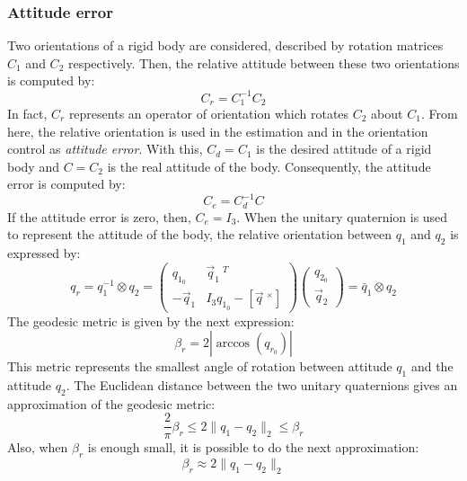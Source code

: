  \subsubsection{Attitude error}

 Two orientations of a rigid body are considered, described by rotation matrices $C_1$ and $C_2$ respectively. Then, the relative attitude between these two orientations is computed by:
 \begin{equation}\label{Cr}
   C_r=C_1^{-1}C_2
 \end{equation}
 In fact, $C_r$ represents an operator of orientation which rotates $C_2$ about $C_1$. From here, the relative orientation is used in the estimation and in the orientation control as \emph{attitude error}. With this, $C_d=C_1$ is the desired attitude of a rigid body and $C=C_2$ is the real attitude of the body.
 Consequently, the attitude error is computed by:
 \begin{equation}\label{Ce}
   C_e=C_d^{-1}C
 \end{equation}
 If the attitude error is zero, then, $C_e=I_3$.
 When the unitary quaternion is used to represent the attitude of the body, the relative orientation between $q_1$ and $q_2$ is expressed by:
 \begin{equation}\label{qr}
   q_r=q_1^{-1}\otimes q_2=\left(\begin{array}{cc}
                                  q_{1_{0}} & \vec{q}_1\ ^T \\
                                  -\vec{q}_1 & I_3q_{1_{0}}-[\vec{q}\ ^\times]\end{array}
   \right)\left(\begin{array}{c}
                  q_{2_0} \\
                  \vec{q}_2 \end{array}\right)=\bar{q}_1\otimes q_2
 \end{equation}
 The geodesic metric is given by the next expression:
 \begin{equation}\label{betar}
   \beta_r=2|\arccos(q_{r_{0}})|
 \end{equation}
 This metric represents the smallest angle of rotation between attitude $q_1$ and the attitude $q_2$. The Euclidean distance between the two unitary quaternions gives an approximation of the geodesic metric:
 \begin{equation}\label{geodesic}
   \frac{2}{\pi}\beta_r\leq2\parallel q_1-q_2\parallel_2\leq\beta_r
 \end{equation}
 Also, when $\beta_r$ is enough small, it is possible to do the next approximation:
 \begin{equation}\label{approx}
   \beta_r\approx2\parallel q_1-q_2\parallel_2
 \end{equation}

